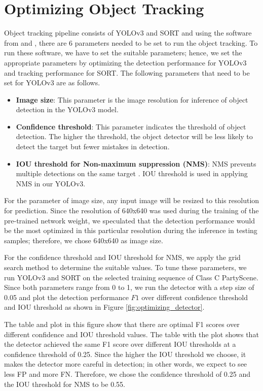 \section{Optimizing Object Tracking}
\label{sec:methods/section_b}

Object tracking pipeline consists of YOLOv3 and SORT and using the software from \cite{jocher_ultralyticsyolov3_2021} and \cite{abewley_abewleysort_2021}, there are 6 parameters needed to be set to run the object tracking. To run these software, we have to set the suitable parameters; hence, we set the appropriate parameters by optimizing the detection performance for YOLOv3 and tracking performance for SORT. The following parameters that need to be set for YOLOv3 are as follows.
\begin{itemize}
    \item \textbf{Image size}: This parameter is the image resolution for inference of object detection in the YOLOv3 model.
    \item \textbf{Confidence threshold}: This parameter indicates the threshold of object detection. The higher the threshold, the object detector will be less likely to detect the target but fewer mistakes in detection.
    \item \textbf{IOU threshold for Non-maximum suppression (NMS)}: NMS prevents multiple detections on the same target \cite{redmon_you_2016}. IOU threshold is used in applying NMS in our YOLOv3.
\end{itemize}
For the parameter of image size, any input image will be resized to this resolution for prediction. Since the resolution of 640x640 was used during the training of the pre-trained network weight, we speculated that the detection performance would be the most optimized in this particular resolution during the inference in testing samples; therefore, we chose 640x640 as image size.

For the confidence threshold and IOU threshold for NMS, we apply the grid search method to determine the suitable values. To tune these parameters, we run YOLOv3 and SORT on the selected training sequence of Class C PartyScene. Since both parameters range from 0 to 1, we run the detector with a step size of 0.05 and plot the detection performance $F1$ over different confidence threshold and IOU threshold as shown in Figure \ref{fig:optimizing_detector}.

The table and plot in this figure show that there are optimal F1 scores over different confidence and IOU threshold values. The table with the plot shows that the detector achieved the same F1 score over different IOU thresholds at a confidence threshold of 0.25. Since the higher the IOU threshold we choose, it makes the detector more careful in detection; in other words, we expect to see less FP and more FN. Therefore, we chose the confidence threshold of 0.25 and the IOU threshold for NMS to be 0.55.

